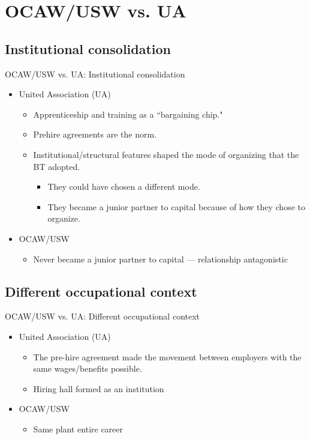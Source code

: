 \documentclass{beamer}
\begin{document}
\section{OCAW/USW vs. UA}
\subsection{Institutional consolidation}
\begin{frame}{OCAW/USW vs. UA: Institutional consolidation}

	\begin{itemize}
		\item United Association (UA)
			\begin{itemize}
				\item Apprenticeship and training as a ``bargaining chip."
				\item Prehire agreements are the norm.
				\item Institutional/structural features shaped the mode of organizing that the BT adopted.
				\begin{itemize}
					\item They could have chosen a different mode.
					\item They became a junior partner to capital because of how they chose to organize.
				\end{itemize}
	\end{itemize}
		\item OCAW/USW
		\begin{itemize}
			\item Never became a junior partner to capital — relationship antagonistic
		\end{itemize}
	\end{itemize}
\end{frame}


\subsection{Different occupational context}
\begin{frame}{OCAW/USW vs. UA: Different occupational context}
	\begin{itemize}
		\item United Association (UA)
		\begin{itemize}
			\item The pre-hire agreement made the movement between employers with the same wages/benefits possible.
			\item Hiring hall formed as an institution
		\end{itemize}
		\item OCAW/USW
			\begin{itemize}
				\item Same plant entire career
			\end{itemize}
	\end{itemize}
\end{frame}
\end{document}
